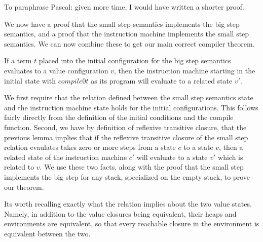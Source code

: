 To paraphrase Pascal: given more time, I would have written a shorter proof.

We now have a proof that the small step semantics implements the big step
semantics, and a proof that the instruction machine implements the small step
semantics. We can now combine these to get our main correct compiler theorem. 

\begin{theorem}
If a term $t$ placed into the initial configuration for the big step semantics
evaluates to a value configuration $v$, then the instruction machine starting
in the initial state with $compile 0 t$ as its program will evaluate to a
related state $v'$.  
\end{theorem}
\begin{proofoutline}
We first require that the relation defined between the small step semantics
state and the instruction machine state holds for the initial configurations.
This follows fairly directly from the definition of the initial conditions and
the compile function. Second, we have by definition of reflexive transitive
closure, that the previous lemma implies that if the reflexive transitive
closure of the small step relation evaulates takes zero or more steps from a
state $c$ to a state $v$, then a related state of the instruction machine $c'$
will evaluate to a state $v'$ which is related to $v$. We use these two facts,
along with the proof that the small step implements the big step for any stack,
specialized on the empty stack, to prove our theorem. 
\end{proofoutline}

Its worth recalling exactly what the relation implies about the two value
states. Namely, in addition to the value closures being equivalent, their heaps
and environments are equivalent, so that every reachable closure in the
environment is equivalent between the two.
